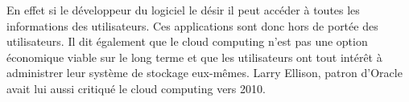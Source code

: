 \documentclass[a4 paper, 12 pt]{article}
\begin{document}
En effet si le développeur du logiciel le désir il peut accéder à toutes les informations des utilisateurs. Ces applications sont donc hors de portée des utilisateurs. Il dit également que le cloud computing n’est pas une option économique viable sur le long terme et que les utilisateurs ont tout intérêt à administrer leur système de stockage eux-mêmes. Larry Ellison, patron d’Oracle avait lui aussi critiqué le cloud computing vers 2010. 

\newpage



\end{document}
